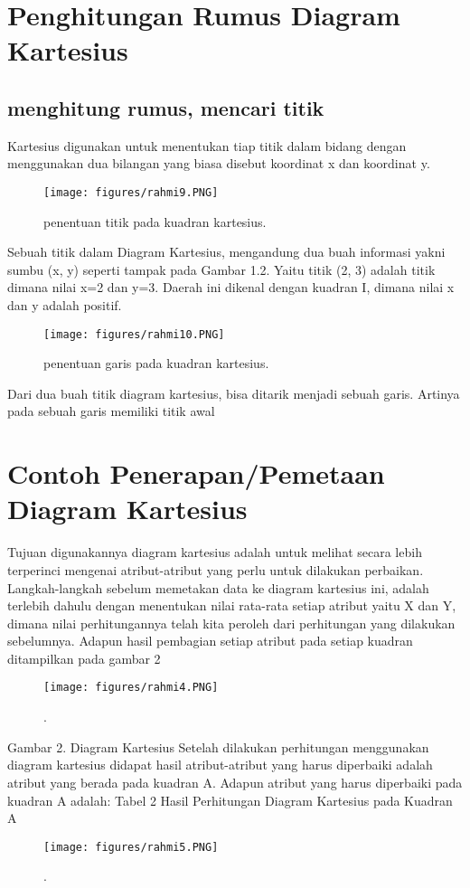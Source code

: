 \section{Penghitungan Rumus Diagram Kartesius}
\subsection{menghitung rumus, mencari titik}

Kartesius digunakan untuk menentukan tiap titik dalam bidang dengan menggunakan dua bilangan yang biasa disebut koordinat x dan koordinat y.
\begin{figure}[ht]
	\centerline{\texttt{[image: figures/rahmi9.PNG]}}
	\caption{penentuan titik pada kuadran kartesius.}
	\label{rahmi9}
	\end{figure}

Sebuah titik dalam Diagram Kartesius, mengandung dua buah informasi yakni sumbu (x, y) seperti tampak pada Gambar 1.2. 
Yaitu titik (2, 3) adalah titik dimana nilai x=2 dan y=3. Daerah ini dikenal dengan kuadran I, dimana nilai x dan y adalah positif.
\begin{figure}[ht]
	\centerline{\texttt{[image: figures/rahmi10.PNG]}}
	\caption{penentuan garis pada kuadran kartesius.}
	\label{rahmi10}
	\end{figure}

Dari dua buah titik diagram kartesius, bisa ditarik menjadi sebuah garis. Artinya pada sebuah garis memiliki titik awal


\section{Contoh Penerapan/Pemetaan Diagram Kartesius}
Tujuan digunakannya diagram kartesius adalah untuk melihat secara lebih terperinci mengenai atribut-atribut yang perlu untuk dilakukan perbaikan. 
Langkah-langkah sebelum memetakan data ke diagram kartesius ini, adalah terlebih dahulu dengan menentukan nilai rata-rata setiap atribut yaitu X dan Y, 
dimana nilai perhitungannya telah kita peroleh dari perhitungan yang dilakukan sebelumnya.
Adapun hasil pembagian setiap atribut pada setiap kuadran ditampilkan pada gambar 2
\begin{figure}[ht]
	\centerline{\texttt{[image: figures/rahmi4.PNG]}}
	\caption{.}
	\label{rahmi4}
	\end{figure}


Gambar 2. Diagram Kartesius
Setelah dilakukan perhitungan menggunakan diagram kartesius didapat hasil atribut-atribut yang harus diperbaiki adalah atribut yang berada pada kuadran A.
Adapun atribut yang harus diperbaiki pada kuadran A adalah:
Tabel 2 Hasil Perhitungan Diagram Kartesius pada Kuadran A	
\begin{figure}[ht]
	\centerline{\texttt{[image: figures/rahmi5.PNG]}}
	\caption{.}
	\label{rahmi5}
	\end{figure}


